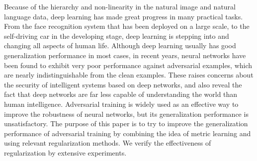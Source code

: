 \begin{abstractEn}

Because of the hierarchy and non-linearity in the natural image and natural language data, deep learning has made great progress in many practical tasks. From the face recognition system that has been deployed on a large scale, to the self-driving car in the developing stage, deep learning is stepping into and changing all aspects of human life. Although deep learning usually has good generalization performance in most cases, in recent years, neural networks have been found to exhibit very poor performance against adversarial examples, which are nearly indistinguishable from the clean examples. These raises concerns about the security of intelligent systems based on deep networks, and also reveal the fact that deep networks are far less capable of understanding the world than human intelligence. Adversarial training is widely used as an effective way to improve the robustness of neural networks, but its generalization performance is unsatisfactory. The purpose of this paper is to try to improve the generalization performance of adversarial training by combining the idea of metric learning and using relevant regularization methods. We verify the effectiveness of regularization by extensive experiments.

\end{abstractEn}



\usepackage{subfig}
\usepackage{rotating}
\usepackage[usenames,dvipsnames]{xcolor}
\usepackage{tikz}
\usepackage{pgfplots}
\pgfplotsset{compat=1.16}
\usepackage{ifthen}
\usepackage{longtable}
\usepackage{siunitx}
\usepackage{listings}
\usepackage{multirow}
\usepackage[bottom]{footmisc}
\usepackage{pifont}
\usepackage{booktabs}   %
\usepackage{hyperref}   %


